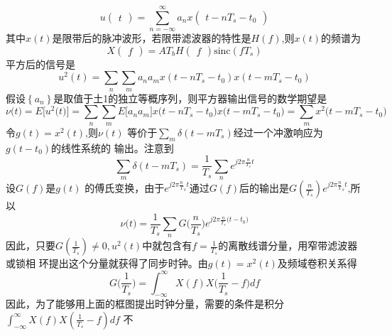 \documentclass[utf8]{article}
\begin{document}
$$u\begin{pmatrix}t\end{pmatrix}=\sum_{n=-\infty}^{\infty}a_nx\begin{pmatrix}t-nT_s-t_0\end{pmatrix}$$
其中$x(t)$是限带后的脉冲波形，若限带滤波器的特性是$H(f)$,则$x(t)$的频谱为
$$X\begin{pmatrix}f\end{pmatrix}=AT_bH\begin{pmatrix}f\end{pmatrix}\text{sinc}(fT_s)$$
平方后的信号是
$$u^2\left(t\right)=\sum_n\sum_ma_na_mx\left(t-nT_s-t_0\right)x\left(t-mT_s-t_0\right)$$
假设$\left\{a_n\right\}$是取值于土1的独立等概序列，则平方器输出信号的数学期望是
$$\nu\big(t\big)=E\bigg[u^{2}\big(t\big)\bigg]=\sum_{n}\sum_{m}E\big[a_{n}a_{m}\big]x\big(t-nT_{s}-t_{0}\big)x\big(t-mT_{s}-t_{0}\big)=\sum_{m}x^{2}\big(t-mT_{s}-t_{0}\big)$$
令$g(t)=x^2\left(t\right)$,则$\nu(t)$ 等价于$\sum_m\delta\left(t-mT_s\right)$经过一个冲激响应为$g\left(t-t_0\right)$的线性系统的
输出。注意到
$$\sum_m\delta(t-mT_s)=\frac{1}{T_s}\sum_ne^{j2\pi\frac{n}{T_s}t}$$
设$G(f)$是$g(t)$ 的傅氏变换，由于$e^{j2\pi\frac nT_st}$通过$G(f)$后的输出是$G\left(\frac n{T_s}\right)e^{j2\pi\frac nT_st}$,所以
$$\nu\big(t\big)=\frac{1}{T_s}\sum_nG\bigg(\frac{n}{T_s}\bigg)e^{j2\pi\frac{n}{T_s}\big(t-t_0\big)}$$
因此，只要$G\left(\frac1{T_s}\right)\neq0,u^{2}\left(t\right)$中就包含有$f=\frac1{T_s}$的离散线谱分量，用窄带滤波器或锁相
环提出这个分量就获得了同步时钟。由$g\left(t\right)=x^2\left(t\right)$及频域卷积关系得
$$G\Bigg(\frac{1}{T_s}\Bigg)=\int_{-\infty}^{\infty}X\left(f\right)X\Bigg(\frac{1}{T_s}-f\Bigg)df$$
因此，为了能够用上面的框图提出时钟分量，需要的条件是积分$\int_{-\infty}^{\infty}X\left(f\right)X\left(\frac1{T_s}-f\right)df$ 不
\end{document}
